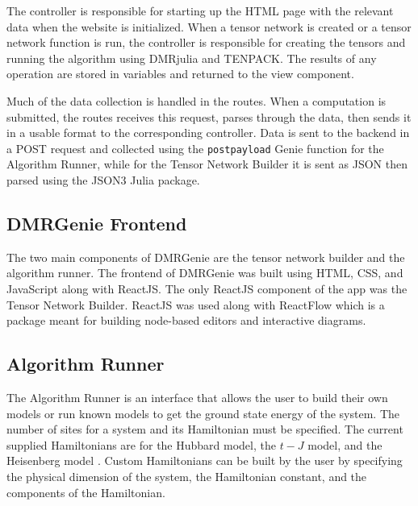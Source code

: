 \documentclass{juliacon}
\begin{document}
The controller is responsible for starting up the HTML page with the relevant data when the website is initialized. When a tensor network is created or a tensor network function is run, the controller is responsible for creating the tensors and running the algorithm using DMRjulia and TENPACK. The results of any operation are stored in variables and returned to the view component.

Much of the data collection is handled in the routes. When a computation is submitted, the routes receives this request, parses through the data, then sends it in a usable format to the corresponding controller. Data is sent to the backend in a POST request and collected using the \texttt{postpayload} Genie function for the Algorithm Runner, while for the Tensor Network Builder it is sent as JSON then parsed using the JSON3 Julia package.

\subsection{DMRGenie Frontend}
The two main components of DMRGenie are the tensor network builder and the algorithm runner. The frontend of DMRGenie was built using HTML, CSS, and JavaScript along with ReactJS. The only ReactJS component of the app was the Tensor Network Builder. ReactJS was used along with ReactFlow which is a package meant for building node-based editors and interactive diagrams. 

\subsection{Algorithm Runner}
The Algorithm Runner is an interface that allows the user to build their own models or run known models to get the ground state energy of the system. The number of sites for a system and its Hamiltonian must be specified. The current supplied Hamiltonians are for the Hubbard model, the $t-J$ model, and the Heisenberg model \cite{fradkin2013field}. Custom Hamiltonians can be built by the user by specifying the physical dimension of the system, the Hamiltonian constant, and the components of the Hamiltonian.
\end{document}
